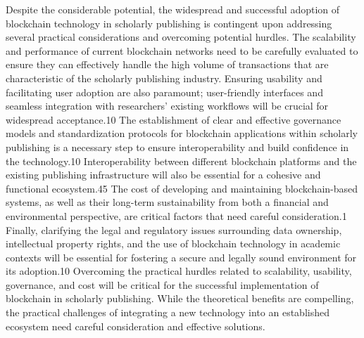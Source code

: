 \documentclass{article}
\begin{document}
Despite the considerable potential, the widespread and successful adoption of blockchain technology in scholarly publishing is contingent upon addressing several practical considerations and overcoming potential hurdles. The scalability and performance of current blockchain networks need to be carefully evaluated to ensure they can effectively handle the high volume of transactions that are characteristic of the scholarly publishing industry. Ensuring usability and facilitating user adoption are also paramount; user-friendly interfaces and seamless integration with researchers' existing workflows will be crucial for widespread acceptance.10 The establishment of clear and effective governance models and standardization protocols for blockchain applications within scholarly publishing is a necessary step to ensure interoperability and build confidence in the technology.10 Interoperability between different blockchain platforms and the existing publishing infrastructure will also be essential for a cohesive and functional ecosystem.45 The cost of developing and maintaining blockchain-based systems, as well as their long-term sustainability from both a financial and environmental perspective, are critical factors that need careful consideration.1 Finally, clarifying the legal and regulatory issues surrounding data ownership, intellectual property rights, and the use of blockchain technology in academic contexts will be essential for fostering a secure and legally sound environment for its adoption.10 Overcoming the practical hurdles related to scalability, usability, governance, and cost will be critical for the successful implementation of blockchain in scholarly publishing. While the theoretical benefits are compelling, the practical challenges of integrating a new technology into an established ecosystem need careful consideration and effective solutions.
\end{document}
